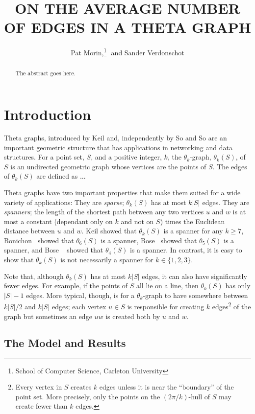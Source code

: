 \documentclass{patmorin}
\title{\MakeUppercase{On the Average Number of Edges in a Theta Graph}}
\author{Pat Morin,\thanks{School of Computer Science, Carleton University}\,\,
         and Sander Verdonschot\footnotemark[1]}
\begin{document}
\maketitle

\begin{abstract}
  The abstract goes here.
\end{abstract}

\section{Introduction}

Theta graphs, introduced by Keil \cite{A} and, independently by So and
So \cite{} are an important geometric structure that has applications
in networking \cite{A} and data structures.  For a point set, $S$, and
a positive integer, $k$, the $\theta_k$-graph, $\theta_k(S)$, of $S$
is an undirected geometric graph whose vertices are the points of $S$.
The edges of $\theta_k(S)$ are defined as ...

Theta graphs have two important properties that make them suited for
a wide variety of applications:  They are \emph{sparse}; $\theta_k(S)$
has at most $k|S|$ edges.  They are \emph{spanners}; the length of the
shortest path between any two vertices $u$ and $w$ is at most a constant
(dependant only on $k$ and not on $S$) times the Euclidean distance
between $u$ and $w$.  Keil \cite{kXX} showed that $\theta_k(S)$ is a
spanner for any $k\ge 7$, Bonichon \etal\ showed that $\theta_6(S)$
is a spanner,  Bose \etal\ showed that $\theta_5(S)$ is a spanner,
and Bose \etal\ \cite{bXX} showed that $\theta_4(S)$ is a spanner.
In contrast, it is easy to show that $\theta_k(S)$ is not necessarily
a spanner for $k\in\{1,2,3\}$.

Note that, although $\theta_k(S)$ has at most $k|S|$ edges,
it can also have significantly fewer edges.  For example, if the points
of $S$ all lie on a line, then $\theta_k(S)$ has only $|S|-1$ edges.
More typical, though, is for a $\theta_k$-graph to have somewhere
between $k|S|/2$ and $k|S|$ edges;  each vertex $u\in S$ is responsible
for creating $k$ edges\footnote{Every vertex in $S$ creates $k$ edges
unless it is near the ``boundary'' of the point set.  More precisely,
only the points on the $(2\pi/k)$-hull \cite{alpha-hull} of $S$ may
create fewer than $k$ edges.} of the graph but sometimes an edge $uw$
is created both by $u$ and $w$.

\subsection{The Model and Results}
\end{document}

